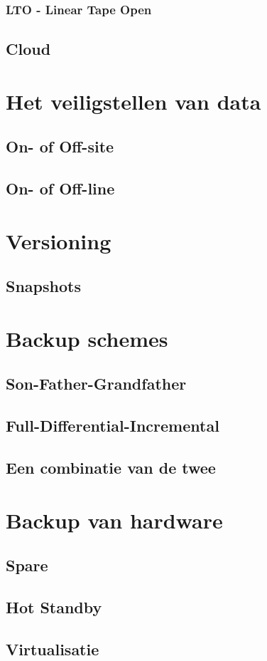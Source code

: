 \documentclass[a4paper,12pt,twoside,openright,titlepage]{book}
\begin{document}
\subsection{LTO - Linear Tape Open}

\section{Cloud}


\chapter{Het veiligstellen van data}
\section{On- of Off-site}

\section{On- of Off-line}


\chapter{Versioning}

\section{Snapshots}


\chapter{Backup schemes}
\section{Son-Father-Grandfather}

\section{Full-Differential-Incremental}

\section{Een combinatie van de twee}


\chapter{Backup van hardware}

\section{Spare}

\section{Hot Standby}

\section{Virtualisatie}


\backmatter
\printindex
\end{document}
